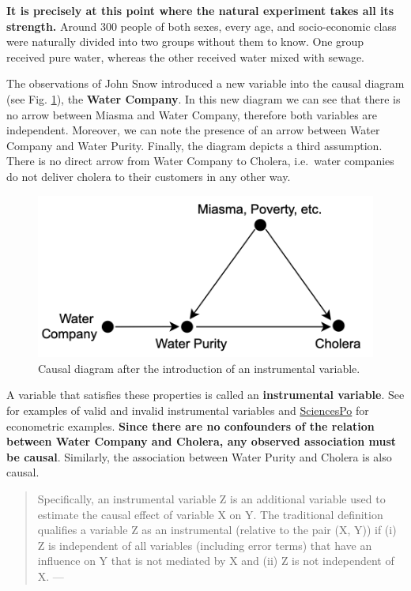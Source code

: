 \documentclass[
]{book}
\begin{document}
\textbf{It is precisely at this point where the natural experiment takes all its strength.} Around 300 people of both sexes, every age, and socio-economic class were naturally divided into two groups without them to know. One group received pure water, whereas the other received water mixed with sewage.

The observations of John Snow introduced a new variable into the causal diagram (see Fig. \ref{fig:snow-dia-B}), the \textbf{Water Company}. In this new diagram we can see that there is no arrow between Miasma and Water Company, therefore both variables are independent. Moreover, we can note the presence of an arrow between Water Company and Water Purity. Finally, the diagram depicts a third assumption. There is no direct arrow from Water Company to Cholera, i.e.~water companies do not deliver cholera to their customers in any other way.

\begin{figure}[htb]

{\centering \includegraphics[width=0.5\linewidth]{Figures/SnowDiagramB} 

}

\caption{Causal diagram after the introduction of an instrumental variable.}\label{fig:snow-dia-B}
\end{figure}

A variable that satisfies these properties is called an \textbf{instrumental variable}. See \citep{pokropek2016introduction} for examples of valid and invalid instrumental variables and \href{https://scpoecon.github.io/ScPoEconometrics/IV.html}{SciencesPo} for econometric examples. \textbf{Since there are no confounders of the relation between Water Company and Cholera, any observed association must be causal}. Similarly, the association between Water Purity and Cholera is also causal.

\begin{quote}
Specifically, an instrumental variable Z is an additional variable used to estimate the causal effect of variable X on Y. The traditional definition qualifies a variable Z as an instrumental (relative to the pair (X, Y)) if (i) Z is independent of all variables (including error terms) that have an influence on Y that is not mediated by X and (ii) Z is not independent of X. --- \citep{pearl2000causality}
\end{quote}
\end{document}
